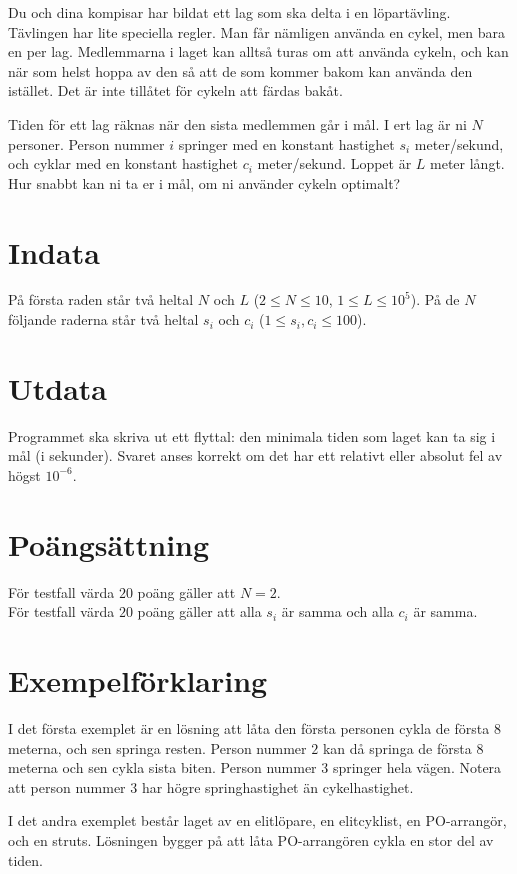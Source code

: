 Du och dina kompisar har bildat ett lag som ska delta i en löpartävling. Tävlingen har lite speciella regler.
Man får nämligen använda en cykel, men bara en per lag. Medlemmarna i laget kan alltså turas om att använda cykeln, och kan
när som helst hoppa av den så att de som kommer bakom kan använda den istället. Det är inte tillåtet för cykeln att färdas bakåt. 

Tiden för ett lag räknas när den sista medlemmen går i mål. I ert lag är ni $N$ personer. Person nummer $i$ springer med en 
konstant hastighet $s_i$ meter/sekund, och cyklar med en konstant hastighet $c_i$ meter/sekund. Loppet är $L$ meter långt.
Hur snabbt kan ni ta er i mål, om ni använder cykeln optimalt?


\section*{Indata}
På första raden står två heltal $N$ och $L$ ($2 \leq N \leq 10$, $1 \leq L \leq 10^5$).
På de $N$ följande raderna står två heltal $s_i$ och $c_i$ ($1 \leq s_i, c_i \leq 100$).

\section*{Utdata}
Programmet ska skriva ut ett flyttal: den minimala tiden som laget kan ta sig i mål (i sekunder).
Svaret anses korrekt om det har ett relativt eller absolut fel av högst $10^{-6}$.

\section*{Poängsättning}
För testfall värda $20$ poäng gäller att $N=2$. \\
För testfall värda $20$ poäng gäller att alla $s_i$ är samma och alla $c_i$ är samma.\\

\section*{Exempelförklaring}
I det första exemplet är en lösning att låta den första personen cykla de första $8$ meterna, och sen springa resten. Person nummer $2$
kan då springa de första $8$ meterna och sen cykla sista biten. Person nummer $3$ springer hela vägen. Notera att person nummer $3$ har
högre springhastighet än cykelhastighet.

I det andra exemplet består laget av en elitlöpare, en elitcyklist, en PO-arrangör, och en struts. Lösningen bygger på att låta PO-arrangören
cykla en stor del av tiden.